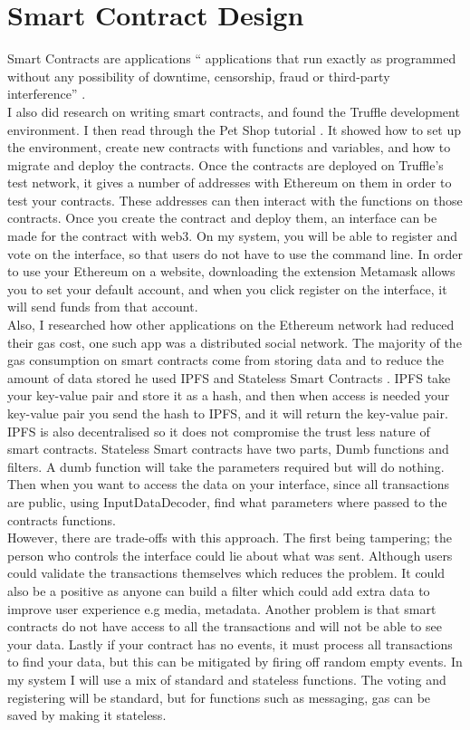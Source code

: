 \section{Smart Contract Design} 
Smart Contracts are applications “ applications that run exactly as programmed without any possibility of downtime, censorship, fraud or third-party interference”  \citep{ethereum:2018:pdflatex}. \\
I also did research on writing smart contracts, and found the Truffle development environment. I then read through the Pet Shop tutorial \citep{Truffle:2017:pdflatex} . It showed how to set up the environment, create new contracts with functions and variables, and how to migrate and deploy the contracts. Once the contracts are deployed on Truffle's test network, it gives a number of addresses with Ethereum on them in order to test your contracts. These addresses can then interact with the functions on those contracts. Once you create the contract and deploy them, an interface can be made for the contract with web3. On my system, you will be able to register and vote on the interface, so that users do not have to use the command line. In order to use your Ethereum on a website, downloading the extension Metamask allows you to set your default account, and when you click register on the interface, it will send funds from that account. \\
Also, I researched how other applications on the Ethereum network had reduced their gas cost, one such app was a distributed social network. The majority of the gas consumption on smart contracts come from storing data and to reduce the amount of data stored he used IPFS and Stateless Smart Contracts \citep{Childs-Maidment:2016:pdflatex}. IPFS take your key-value pair and store it as a hash, and then when access is needed your key-value pair you send the hash to IPFS, and it will return the key-value pair. IPFS is also decentralised so it does not compromise the trust less nature of smart contracts. Stateless Smart contracts have two parts, Dumb functions and filters. A dumb function will take the parameters required but will do nothing. Then when you want to access the data on your interface, since all transactions are public, using InputDataDecoder, find what parameters where passed to the contracts functions.  \\
However, there are trade-offs with this approach. The first being tampering; the person who controls the interface could lie about what was sent.  Although users could validate the transactions themselves which reduces the problem. It could also be a positive as anyone can build a filter which could add extra data to improve user experience e.g media, metadata. Another problem is that smart contracts do not have access to all the transactions and will not be able to see your data. Lastly if your contract has no events, it must process all transactions to find your data, but this can be mitigated by firing off random empty events. In my system I will use a mix of standard and stateless functions. The voting and registering will be standard, but for functions such as messaging, gas can be saved by making it stateless. \\
